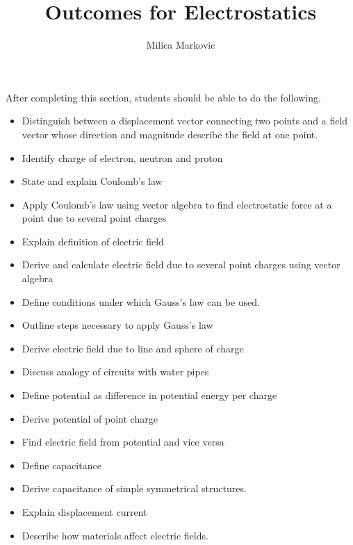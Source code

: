 \documentclass{ximera}
\title{Outcomes for Electrostatics}
\author{Milica Markovic}
\begin{document}
\begin{abstract}
\end{abstract}

\maketitle

\begin{sectionOutcomes}

After completing this section, students should be able to do the following.

\begin{itemize}
\item Distinguish between a displacement vector connecting two points and a field vector whose direction and magnitude describe the field at one point.
\item Identify charge of electron, neutron and proton 
\item State and explain Coulomb’s law
\item Apply Coulomb’s law using vector algebra to find electrostatic force at a point due to several point charges
\item Explain definition of electric field
\item Derive and calculate electric field due to several point charges using vector algebra 
\item Define conditions under which Gauss’s law can be used.
\item Outline steps necessary to apply Gauss’s law
\item Derive electric field due to line and sphere of charge
\item Discuss analogy of circuits with water pipes
\item Define potential as difference in potential energy per charge
\item  Derive potential of point charge
\item Find electric field from potential and vice versa
\item Define capacitance
\item Derive capacitance of simple symmetrical structures.
\item Explain displacement current
\item Describe how materials affect electric fields.
\end{itemize}

\end{sectionOutcomes}
\end{document}
